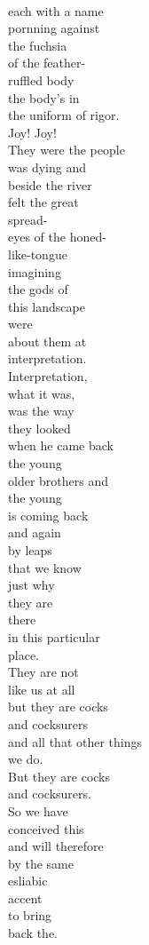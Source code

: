 \documentclass[smalldemyvopaper,11pt,twoside,onecolumn,openright,extrafontsizes]{memoir}
\begin{document}
\\each with a name
\\pornning against
\\the fuchsia
\\of the feather-
\\ruffled body
\\the body's in
\\the uniform of rigor.
\\Joy! Joy!
\\They were the people
\\was dying and
\\beside the river
\\felt the great
\\spread-
\\eyes of the honed-
\\like-tongue
\\imagining
\\the gods of
\\this landscape
\\were
\\about them at
\\interpretation.
\\Interpretation,
\\what it was,
\\was the way
\\they looked
\\when he came back
\\the young
\\older brothers and
\\the young
\\is coming back
\\and again
\\by leaps
\\that we know
\\just why
\\they are
\\there
\\in this particular
\\place.
\\They are not
\\like us at all
\\but they are cocks
\\and cocksurers
\\and all that other things
\\we do.
\\But they are cocks
\\and cocksurers.
\\So we have
\\conceived this
\\and will therefore
\\by the same
\\esliabic
\\accent
\\to bring
\\back the.
\end{document}
